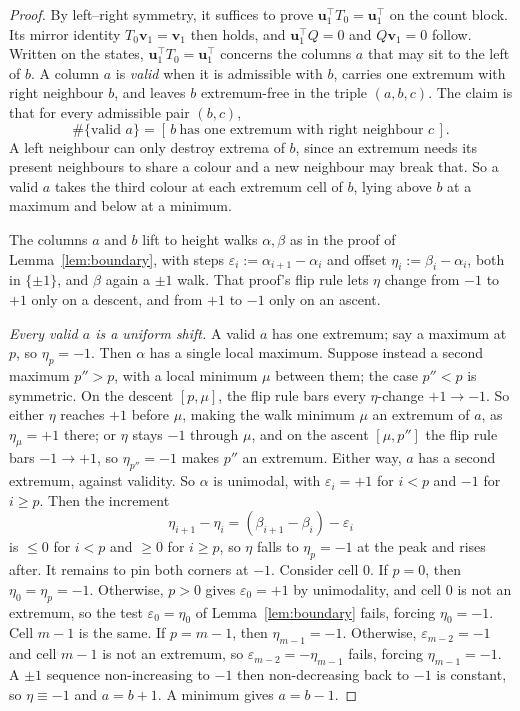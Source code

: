 \documentclass[11pt]{article}
\theoremstyle{definition}
\theoremstyle{remark}
\begin{document}
\begin{proof}
By left--right symmetry, it suffices to prove $\mathbf u_1^{\!\top}T_0=\mathbf u_1^{\!\top}$ on the
count block. Its mirror identity $T_0\mathbf v_1=\mathbf v_1$
then holds, and $\mathbf u_1^{\!\top}Q=0$ and $Q\mathbf v_1=0$ follow. Written on
the states, $\mathbf u_1^{\!\top}T_0=\mathbf u_1^{\!\top}$ concerns the columns $a$ that may sit to
the left of $b$. A column $a$ is \emph{valid} when it is admissible with $b$, carries one
extremum with right neighbour $b$, and leaves $b$ extremum-free in the triple
$(a,b,c)$. The claim is that for every admissible pair $(b,c)$,
\begin{equation}\label{eq:frozenid}
  \#\{\text{valid }a\}=[\,b\ \text{has one extremum with right neighbour }c\,].
\end{equation}
A left neighbour can only destroy extrema of $b$, since an extremum needs its
present neighbours to share a colour and a new neighbour may break that. So a valid
$a$ takes the third colour at each extremum cell of $b$, lying above $b$ at a
maximum and below at a minimum.

\medskip\noindent
The columns $a$ and $b$ lift to height walks $\alpha,\beta$ as in the proof of
Lemma~\ref{lem:boundary}, with steps $\varepsilon_i:=\alpha_{i+1}-\alpha_i$ and
offset $\eta_i:=\beta_i-\alpha_i$, both in $\{\pm1\}$, and $\beta$ again a $\pm1$
walk. That proof's flip rule lets $\eta$ change from $-1$ to $+1$
only on a descent, and from $+1$ to $-1$ only on an ascent.

\medskip\noindent\emph{Every valid $a$ is a uniform shift.} A valid $a$ has one
extremum; say a maximum at $p$, so $\eta_p=-1$. Then $\alpha$ has a single local
maximum. Suppose instead a second maximum $p''>p$, with a local minimum $\mu$
between them; the case $p''<p$ is symmetric. On the descent $[p,\mu]$, the flip
rule bars every $\eta$-change $+1\to-1$. So either $\eta$ reaches $+1$ before $\mu$,
making the walk minimum $\mu$ an extremum of $a$, as $\eta_\mu=+1$ there; or $\eta$
stays $-1$ through $\mu$, and on the ascent $[\mu,p'']$ the flip rule bars
$-1\to+1$, so $\eta_{p''}=-1$ makes $p''$ an extremum. Either way, $a$ has a second
extremum, against validity. So $\alpha$ is unimodal, with $\varepsilon_i=+1$ for
$i<p$ and $-1$ for $i\ge p$. Then the increment
\[
  \eta_{i+1}-\eta_i=(\beta_{i+1}-\beta_i)-\varepsilon_i
\]
is $\le0$ for $i<p$ and $\ge0$ for $i\ge p$, so $\eta$ falls to $\eta_p=-1$ at the peak and rises after. It
remains to pin both corners at $-1$. Consider cell $0$. If $p=0$, then
$\eta_0=\eta_p=-1$. Otherwise, $p>0$ gives $\varepsilon_0=+1$ by unimodality, and
cell $0$ is not an extremum, so the test $\varepsilon_0=\eta_0$ of
Lemma~\ref{lem:boundary} fails, forcing $\eta_0=-1$. Cell $m-1$ is the same. If
$p=m-1$, then $\eta_{m-1}=-1$. Otherwise, $\varepsilon_{m-2}=-1$ and cell $m-1$ is
not an extremum, so $\varepsilon_{m-2}=-\eta_{m-1}$ fails, forcing $\eta_{m-1}=-1$.
A $\pm1$ sequence non-increasing to $-1$ then non-decreasing back
to $-1$ is constant, so $\eta\equiv-1$ and $a=b+1$. A minimum gives $a=b-1$.


\end{proof}
\end{document}
